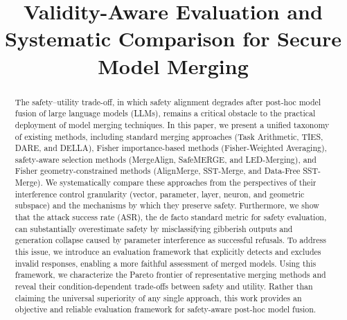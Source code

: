 \documentclass{article}
\title{Validity-Aware Evaluation and Systematic Comparison for Secure Model Merging}
\author{%
}
\begin{document}
\maketitle


\begin{abstract}

The safety--utility trade-off, in which safety alignment degrades after post-hoc model fusion of large language models (LLMs), remains a critical obstacle to the practical deployment of model merging techniques. In this paper, we present a unified taxonomy of existing methods, including standard merging approaches (Task Arithmetic, TIES, DARE, and DELLA), Fisher importance-based methods (Fisher-Weighted Averaging), safety-aware selection methods (MergeAlign, SafeMERGE, and LED-Merging), and Fisher geometry-constrained methods (AlignMerge, SST-Merge, and Data-Free SST-Merge). We systematically compare these approaches from the perspectives of their interference control granularity (vector, parameter, layer, neuron, and geometric subspace) and the mechanisms by which they preserve safety.
Furthermore, we show that the attack success rate (ASR), the de facto standard metric for safety evaluation, can substantially overestimate safety by misclassifying gibberish outputs and generation collapse caused by parameter interference as successful refusals. To address this issue, we introduce an evaluation framework that explicitly detects and excludes invalid responses, enabling a more faithful assessment of merged models. Using this framework, we characterize the Pareto frontier of representative merging methods and reveal their condition-dependent trade-offs between safety and utility.
Rather than claiming the universal superiority of any single approach, this work provides an objective and reliable evaluation framework for safety-aware post-hoc model fusion.
\end{abstract}
\end{document}
